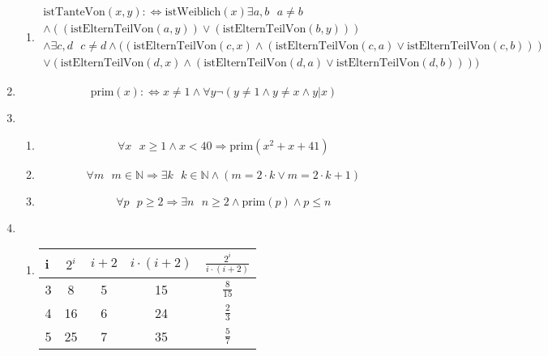 \documentclass[a4paper]{article}
\begin{document}
\begin{enumerate}
\begin{enumerate}
			\item
			\begin{equation*}
				\begin{aligned}
					\text{istTanteVon}(x, y) :\Leftrightarrow \text{istWeiblich}(x) \exists a, b \text{ } a \neq b \\ \land ((\text{istElternTeilVon}(a, y)) \lor (\text{istElternTeilVon}(b, y))) \\ \land \exists c, d \text{ } c \neq d \land ((\text{istElternTeilVon}(c, x) \land (\text{istElternTeilVon}(c, a) \lor \text{istElternTeilVon}(c, b))) \\ \lor (\text{istElternTeilVon}(d, x) \land (\text{istElternTeilVon}(d, a) \lor \text{istElternTeilVon}(d, b))))
				\end{aligned}
			\end{equation*}
		\end{enumerate}
		
		\item
		\begin{equation*}
			\text{prim}(x) :\Leftrightarrow x \neq 1 \land \forall y \lnot (y \neq 1 \land y \neq x \land y|x)
		\end{equation*}
		
		\item
		\begin{enumerate}
			\item
			\begin{equation*}
				\forall x \text{ } x \geq 1 \land x < 40 \Rightarrow \text{prim}(x^{2} + x + 41)
			\end{equation*}
			
			\item
			\begin{equation*}
				\forall m \text{ } m \in \mathbb{N} \Rightarrow \exists k \text{ } k \in \mathbb{N} \land (m = 2 \cdot k \lor m = 2 \cdot k + 1)
			\end{equation*}
			
			\item
			\begin{equation*}
				\forall p \text{ } p \geq 2 \Rightarrow \exists n \text{ } n \geq 2 \land \text{prim}(p) \land p \leq n
			\end{equation*}
		\end{enumerate}
		
		\item
		\begin{enumerate}
			\item
			\begin{center}
				\begin{tabular}{|l|c|c|c|c|}
					\firsthline
						i & $2^{i}$ & $i + 2$ & $i \cdot (i + 2)$ & $\frac{2^{i}}{i \cdot (i + 2)}$ \\
					\hline
						3 & 8 & 5 & 15 & $\frac{8}{15}$ \\
					\hline
						4 & 16 & 6 & 24 & $\frac{2}{3}$ \\
					\hline
						5 & 25 & 7 & 35 & $\frac{5}{7}$ \\
					\hline
				\end{tabular}
			\end{center}
			

\end{enumerate}
\end{enumerate}
\end{document}
